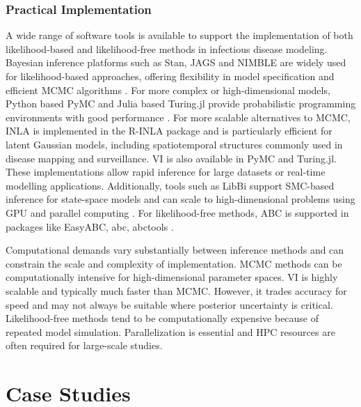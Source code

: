 \documentclass{article}
\begin{document}
\subsubsection{Practical Implementation}

A wide range of software tools is available to support the implementation of both likelihood-based and likelihood-free methods in infectious disease modeling. Bayesian inference platforms such as Stan, JAGS and NIMBLE are widely used for likelihood-based approaches, offering flexibility in model specification and efficient MCMC algorithms \citep{carpenter2017stan,abril2023pymc}. For more complex or high-dimensional models, Python based PyMC and Julia based Turing.jl provide probabilistic programming environments with good performance \citep{abril2023pymc,ge2018turing,fjelde2025turing}. For more scalable alternatives to MCMC, INLA is implemented in the R-INLA package \citep{martins2013bayesian} and is particularly efficient for latent Gaussian models, including spatiotemporal structures commonly used in disease mapping and surveillance. VI is also available in PyMC and Turing.jl. These implementations allow rapid inference for large datasets or real-time modelling applications.  Additionally, tools such as LibBi support SMC-based inference for state-space models and can scale to high-dimensional problems using GPU and parallel computing \citep{murray2015bayesian}. For likelihood-free methods, ABC is supported in packages like EasyABC, abc, abctools \citep{jabot2013easy,csillery2012abc,nunes2015abctools}.

Computational demands vary substantially between inference methods and can constrain the scale and complexity of implementation. MCMC methods can be computationally intensive for high-dimensional parameter spaces. VI is highly scalable and typically much faster than MCMC. However, it trades accuracy for speed and may not always be suitable where posterior uncertainty is critical. Likelihood-free methods tend to be computationally expensive because of repeated model simulation. Parallelization is essential and HPC resources are often required for large-scale studies. 


\section{Case Studies}
\end{document}
